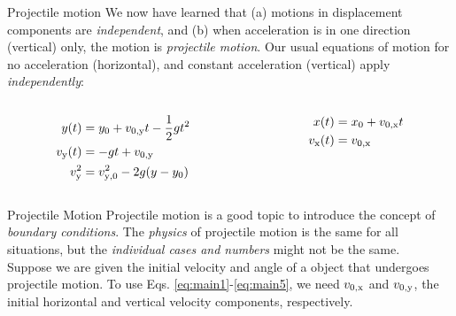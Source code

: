 \documentclass{beamer}
\begin{document}
\begin{frame}{Projectile motion}
\small
We now have learned that (a) motions in displacement components are \textit{independent}, and (b) when acceleration is in \alert{one direction} (vertical) only, the motion is \textit{projectile motion}.  Our usual equations of motion for no acceleration (horizontal), and constant acceleration (vertical) apply \textit{independently}:
\begin{columns}[T]
\begin{column}{0.5\textwidth}
\begin{align}
y(t) &= y_{\rm 0} + v_{\rm 0,y} t - \frac{1}{2}gt^2 \label{eq:main1} \\
v_{\rm y}(t) &= -gt+v_{\rm 0,y} \label{eq:main2} \\
v_{\rm y}^2 &= v_{\rm y,0}^2 - 2g(y-y_{\rm 0}) \label{eq:main3}
\end{align}
\end{column}
\begin{column}{0.5\textwidth}
\begin{align}
x(t) &= x_{\rm 0} + v_{\rm 0,x}t \label{eq:main4} \\
v_{\rm x}(t) &= v_{\rm 0,x} \label{eq:main5}
\end{align}
\end{column}
\end{columns}
\end{frame}

\begin{frame}{Projectile Motion}
\small
Projectile motion is a good topic to introduce the concept of \textit{boundary conditions}.  The \textit{physics} of projectile motion is the same for all situations, but the \textit{individual cases and numbers} might not be the same. \\
\vspace{0.5cm}
Suppose we are given the initial velocity and angle of a object that undergoes projectile motion.  To use Eqs. \ref{eq:main1}-\ref{eq:main5}, we need $v_{\rm 0,x}$ and $v_{\rm 0,y}$, the initial horizontal and vertical velocity components, respectively.
\end{frame}
\end{document}
